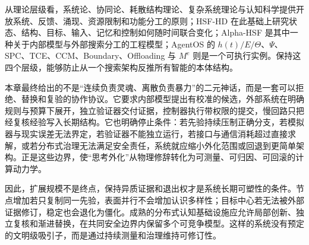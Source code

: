 从理论层级看，系统论、协同论、耗散结构理论、复杂系统理论与认知科学提供开放系统、反馈、涌现、资源限制和功能分工的原则；HSF-HD 在此基础上研究状态、结构、目标、输入、记忆和控制如何随时间联合变化；Alpha-HSF 是其中一种关于内部模型与外部搜索分工的工程模型；AgentOS 的 $h(t)/E/\Theta$、$\Psi$、SPC、TCE、CCM、Boundary、Offloading 与 $M^e$ 则是一个可执行实例。保持这四个层级，能够防止从一个搜索架构反推所有智能的本体结构。

本章最终给出的不是“连续负责灵魂、离散负责暴力”的二元神话，而是一套可以拒绝、替换和复验的协作协议。它要求内部模型提出有校准的候选，外部系统在明确规则与预算下展开，独立验证器交付证据，控制器执行带权限的提交，慢回路只把经复核经验写入长期结构。它也明确停止条件：若先验持续压制正确分支，若模拟器与现实误差无法界定，若验证器不能独立运行，若接口与通信消耗超过直接求解，或若分布式治理无法满足安全责任，系统就应缩小外化范围或回退到更简单架构。正是这些边界，使“思考外化”从物理修辞转化为可测量、可归因、可回滚的计算动力学。

因此，扩展规模不是终点，保持异质证据和退出权才是系统长期可塑性的条件。节点增加若只复制同一先验，表面并行不会增加认识多样性；目标中心若无法被外部证据修订，稳定也会退化为僵化。成熟的分布式认知基础设施应允许局部创新、独立复核和渐进替换，在共同安全边界内保留多个可竞争模型。这样的系统没有预定的文明级吸引子，而是通过持续测量和治理维持可修订性。

